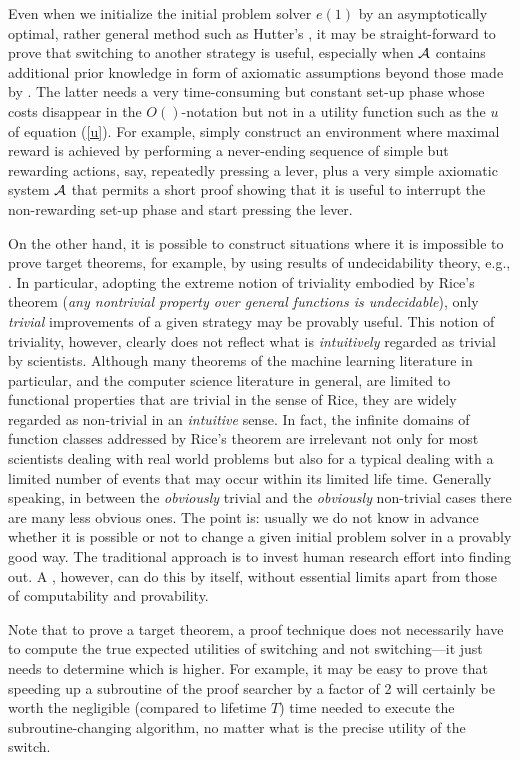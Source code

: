 Even when we initialize the initial problem solver $e(1)$ by an
asymptotically optimal, rather general method such as Hutter's \tl 
\cite{Hutter:01aixi+,Hutter:04book+},
it may be straight-forward to prove that switching to
another strategy is useful,
especially when $\cal A$ contains additional prior
knowledge in form of axiomatic assumptions 
beyond those made by \tln .  The latter needs a very time-consuming but constant set-up
phase whose costs disappear in the $O()$-notation but not in 
a utility function such as the $u$ of equation (\ref{u}). 
For example, simply construct an environment where
maximal reward is achieved by performing a never-ending sequence
of simple but rewarding actions, say, repeatedly pressing a lever,
plus a very simple axiomatic system $\cal A$ that permits a short proof
showing that it is useful to interrupt the non-rewarding set-up phase and
start pressing the lever. 

On the other hand, it is possible to construct
situations where it is impossible to prove target theorems,
for example, by using results of undecidability theory, 
e.g., \cite{Goedel:31,Rice:53,Blum:67,Blum:71}.
In particular, adopting the extreme notion of triviality
embodied by Rice's theorem \cite{Rice:53}
({\em any nontrivial property over general
functions is undecidable}), only {\em trivial}
improvements of a given strategy may be provably useful.
This notion of triviality, however, clearly does not reflect
what is {\em intuitively} regarded as trivial by scientists.
Although many theorems of the machine learning
literature in particular,  and the computer science 
literature in general, are limited to functional properties that
are trivial in the sense of Rice, they are widely regarded 
as non-trivial in an {\em intuitive} sense. 
In fact, the infinite domains of function classes 
addressed by Rice's theorem 
are irrelevant not only for most scientists dealing
with real world problems 
but also for a typical \gm dealing
with a limited number of events that
may occur within its limited life time. 
Generally speaking, in between the {\em obviously} trivial and the {\em obviously}
non-trivial cases there are many less obvious ones.
The point is: usually we do not know in advance whether it is
possible or not to change a given initial problem solver
in a provably good way.  The traditional approach is to 
invest human research effort into finding out. A \gmn, however, can 
do this by itself, without essential limits
apart from those of computability and provability.  

Note that to prove a target theorem, 
a proof technique does not necessarily have to compute
the true expected utilities of switching and not
switching---it just needs to determine which is higher.
For example, it may be easy to prove that
speeding up a subroutine of the proof searcher
by a factor of 2 will certainly be worth
the negligible (compared to lifetime $T$) time needed to
execute the subroutine-changing algorithm, no matter
what is the precise utility of the switch.


